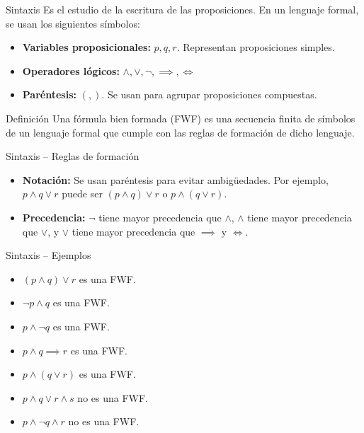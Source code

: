 \documentclass[dvisvgm,hypertex,aspectratio=169]{beamer}
\begin{document}
\begin{frame}{Sintaxis}
  Es el estudio de la escritura de las proposiciones. En un lenguaje formal, se usan los siguientes símbolos:
  \begin{itemize}[<+->]
    \item \textbf{Variables proposicionales:} $p, q, r$. Representan proposiciones simples.
    \item \textbf{Operadores lógicos:} $\land, \lor, \neg, \implies, \iff$
    \item \textbf{Paréntesis:} $(, )$. Se usan para agrupar proposiciones compuestas.
  \end{itemize}
  \pause
  \begin{block}{Definición}
    Una fórmula bien formada (FWF) es una secuencia finita de símbolos de un lenguaje formal que cumple con las reglas de formación de dicho lenguaje.
  \end{block}
\end{frame}
\begin{frame}{Sintaxis -- Reglas de formación}
  \begin{itemize}[<+->]
    \begin{enumerate}
      \item Toda variable proposicional es una FWF.
      \item Si $\alpha$ es una FWF, entonces $\neg \alpha$ también lo es.
      \item Si $\alpha$ y $\beta$ son FWF, entonces $(\alpha \land \beta)$, $(\alpha \lor \beta)$, $(\alpha \implies \beta)$ y $(\alpha \iff \beta)$ también lo son.
      \item Es el conjunto más pequeño que cumple con las reglas anteriores.
    \end{enumerate}
    \item \textbf{Notación:} Se usan paréntesis para evitar ambigüedades. Por ejemplo, $p \land q \lor r$ puede ser $(p \land q) \lor r$ o $p \land (q \lor r)$.
    \item \textbf{Precedencia:} $\neg$ tiene mayor precedencia que $\land$, $\land$ tiene mayor precedencia que $\lor$, y $\lor$ tiene mayor precedencia que $\implies$ y $\iff$.
  \end{itemize}
\end{frame}
\begin{frame}{Sintaxis -- Ejemplos}
  \begin{itemize}[<+->]
    \item $(p \land q) \lor r$ es una FWF.
    \item $\neg p \land q$ es una FWF.
    \item $p \land \neg q$ es una FWF.
    \item $p \land q \implies r$ es una FWF.
    \item $p \land (q \lor r)$ es una FWF.
    \item $p \land q \lor r \land s$ no es una FWF.
    \item $p \land \neg q \land r$ no es una FWF.
  \end{itemize}
\end{frame}
\end{document}
